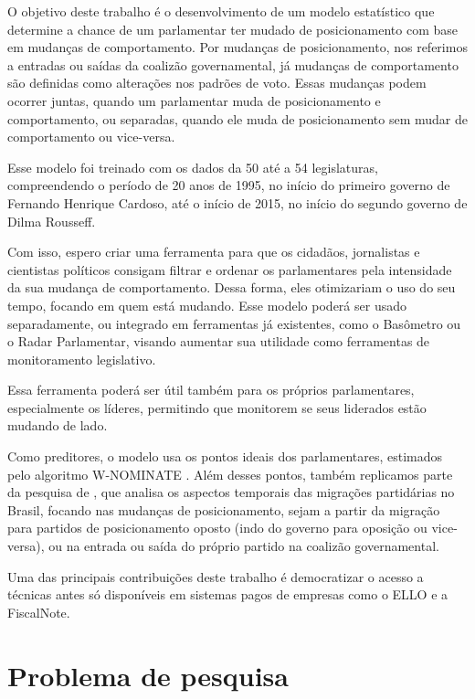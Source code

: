 O objetivo deste trabalho é o desenvolvimento de um modelo estatístico que
determine a chance de um parlamentar ter mudado de posicionamento com base em
mudanças de comportamento. Por mudanças de posicionamento, nos referimos a
entradas ou saídas da coalizão governamental, já mudanças de comportamento são
definidas como alterações nos padrões de voto. Essas mudanças podem ocorrer
juntas, quando um parlamentar muda de posicionamento e comportamento, ou
separadas, quando ele muda de posicionamento sem mudar de comportamento ou
vice-versa.

Esse modelo foi treinado com os dados da 50\textordfeminine{} até a
54\textordfeminine{} legislaturas, compreendendo o período de 20 anos de 1995,
no início do primeiro governo de Fernando Henrique Cardoso, até o início de
2015, no início do segundo governo de Dilma Rousseff.

Com isso, espero criar uma ferramenta para que os cidadãos, jornalistas e
cientistas políticos consigam filtrar e ordenar os parlamentares pela
intensidade da sua mudança de comportamento. Dessa forma, eles otimizariam o
uso do seu tempo, focando em quem está mudando. Esse modelo poderá ser usado
separadamente, ou integrado em ferramentas já existentes, como o Basômetro ou o
Radar Parlamentar, visando aumentar sua utilidade como ferramentas de
monitoramento legislativo.

Essa ferramenta poderá ser útil também para os próprios parlamentares,
especialmente os líderes, permitindo que monitorem se seus liderados estão
mudando de lado.

Como preditores, o modelo usa os pontos ideais dos parlamentares, estimados
pelo algoritmo W-NOMINATE \cite{Poole1985,Poole2005}. Além desses pontos,
também replicamos parte da pesquisa de , que analisa os
aspectos temporais das migrações partidárias no Brasil, focando nas mudanças de
posicionamento, sejam a partir da migração para partidos de posicionamento
oposto (indo do governo para oposição ou vice-versa), ou na entrada ou saída do
próprio partido na coalizão governamental.

Uma das principais contribuições deste trabalho é democratizar o acesso a
técnicas antes só disponíveis em sistemas pagos de empresas como o \gls{ELLO}
e a FiscalNote.

\section{Problema de pesquisa}
\label{cap:introducao:problemas-de-pesquisa}

